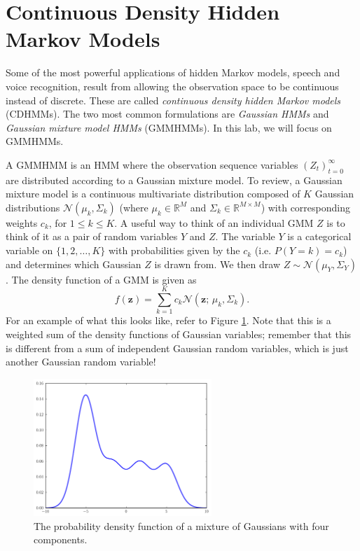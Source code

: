 
\section*{Continuous Density Hidden Markov Models}
Some of the most powerful applications of hidden Markov models, speech and voice recognition, result from allowing the observation space to be continuous instead of discrete.
These are called \emph{continuous density hidden Markov models} (CDHMMs).
The two most common formulations are \emph{Gaussian HMMs} and \emph{Gaussian mixture model HMMs} (GMMHMMs).
In this lab, we will focus on GMMHMMs.

A GMMHMM is an HMM where the observation sequence variables $(Z_t)_{t=0}^\infty$ are distributed according to a Gaussian mixture model.
To review, a Gaussian mixture model is a continuous multivariate distribution composed of $K$ Gaussian distributions $\mathcal N(\mu_k,\Sigma_k)$ (where $\mu_k\in \mathbb{R}^M$ and $\Sigma_k\in \mathbb{R}^{M\times M}$) with corresponding weights $c_k$, for $1\leq k \leq K$.
A useful way to think of an individual GMM $Z$ is to think of it as a pair of random variables $Y$ and $Z$.
The variable $Y$ is a categorical variable on $\{1,2,\ldots, K\}$ with probabilities given by the $c_k$ (i.e. $P(Y=k)=c_k$) and determines which Gaussian $Z$ is drawn from.
We then draw $Z\sim \mathcal N(\mu_Y, \Sigma_Y)$.
The density function of a GMM is given as
\[
f(\mathbf{z})=\sum_{k=1}^K c_k\mathcal N(\mathbf{z};\,\mu_k,\Sigma_k).
\]
For an example of what this looks like, refer to Figure \ref{fig:mixture}.
Note that this is a weighted sum of the density functions of Gaussian variables; remember that this is different from a sum of independent Gaussian random variables, which is just another Gaussian random variable!

\begin{figure}
\centering
\includegraphics[width=0.6\textwidth]{figures/mixture.pdf}
\caption{The probability density function of a mixture of Gaussians with four components.}
\label{fig:mixture}
\end{figure}

